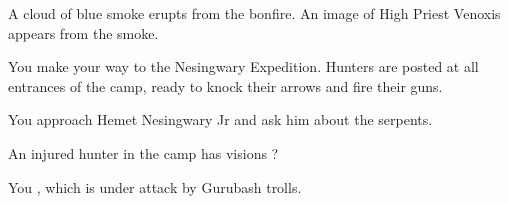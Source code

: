 




A cloud of blue smoke erupts from the bonfire. An image of High Priest Venoxis appears from the smoke.







You make your way to the Nesingwary Expedition. Hunters are posted at all entrances of the camp, ready to knock their arrows and fire their guns.


You approach Hemet Nesingwary Jr and ask him about the serpents.


An injured hunter in the camp has visions ?





You , which is under attack by Gurubash trolls.

